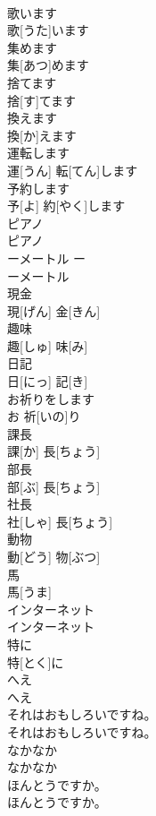 \documentclass[8pt]{extreport}
\begin{document}
\begin{CJK}{UTF8}{min}
\\	歌います	
\\	歌[うた]います		
\\	集めます	
\\	集[あつ]めます		
\\	捨てます	
\\	捨[す]てます		
\\	換えます	
\\	換[か]えます		
\\	運転します	
\\	運[うん] 転[てん]します		
\\	予約します	
\\	予[よ] 約[やく]します		
\\	ピアノ	
\\	ピアノ		
\\	ーメートル	ー 
\\	ーメートル		
\\	現金	
\\	現[げん] 金[きん]		
\\	趣味	
\\	趣[しゅ] 味[み]		
\\	日記	
\\	日[にっ] 記[き]		
\\	お祈りをします	
\\	お 祈[いの]り		
\\	課長	
\\	課[か] 長[ちょう]		
\\	部長	
\\	部[ぶ] 長[ちょう]		
\\	社長	
\\	社[しゃ] 長[ちょう]		
\\	動物	
\\	動[どう] 物[ぶつ]		
\\	馬	
\\	馬[うま]		
\\	インターネット	
\\	インターネット		
\\	特に	
\\	特[とく]に		
\\	へえ	
\\	へえ		
\\	それはおもしろいですね。	
\\	それはおもしろいですね。		
\\	なかなか	
\\	なかなか		
\\	ほんとうですか。	
\\	ほんとうですか。		

\end{CJK}
\end{document}

